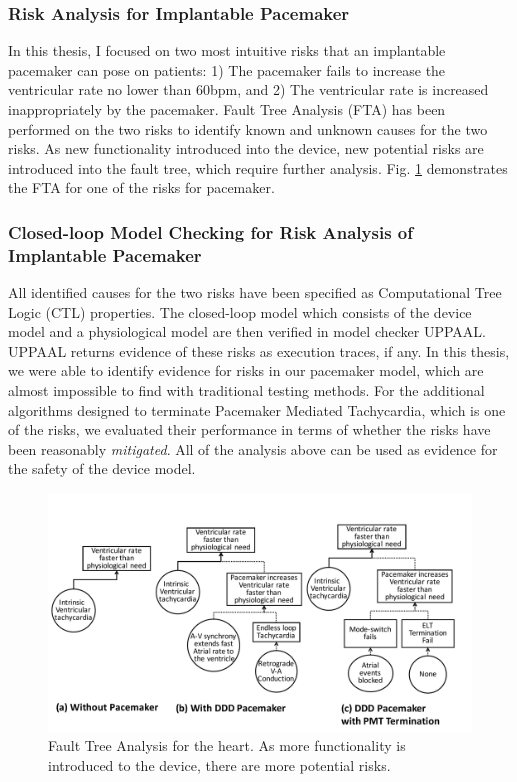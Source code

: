 \documentclass[a4paper,11pt]{article}
\begin{document}
\subsubsection{Risk Analysis for Implantable Pacemaker}
In this thesis, I focused on two most intuitive risks that an implantable pacemaker can pose on patients: 1) The pacemaker fails to increase the ventricular rate no lower than 60bpm, and 2) The ventricular rate is increased inappropriately by the pacemaker.
Fault Tree Analysis (FTA) has been performed on the two risks to identify known and unknown causes for the two risks. 
As new functionality introduced into the device, new potential risks are introduced into the fault tree, which require further analysis.
Fig. \ref{fig:FTA} demonstrates the FTA for one of the risks for pacemaker.
\subsubsection{Closed-loop Model Checking for Risk Analysis of Implantable Pacemaker}
All identified causes for the two risks have been specified as Computational Tree Logic (CTL) properties.
The closed-loop model which consists of the device model and a physiological model are then verified in model checker UPPAAL.
UPPAAL returns evidence of these risks as execution traces, if any.
In this thesis, we were able to identify evidence for risks in our pacemaker model, which are almost impossible to find with traditional testing methods.
For the additional algorithms designed to terminate Pacemaker Mediated Tachycardia, which is one of the risks, we evaluated their performance in terms of whether the risks have been reasonably \emph{mitigated}.
All of the analysis above can be used as evidence for the safety of the device model.

\begin{figure}[t]
	\centering
	\includegraphics[scale=0.35]{figs/FTA_new.pdf}
	\caption{\small Fault Tree Analysis for the heart. As more functionality is introduced to the device, there are more potential risks.}
	\label{fig:FTA}
\end{figure}
\end{document}
